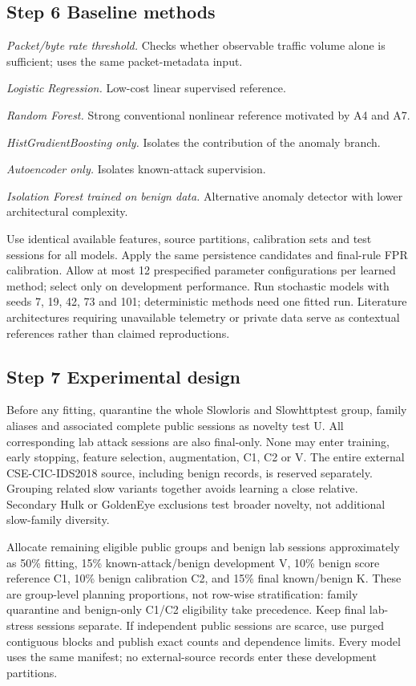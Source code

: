 \documentclass[conference]{IEEEtran}
\begin{document}
\subsection{Step 6 Baseline methods}
\noindent\textit{Packet/byte rate threshold.} Checks whether observable traffic volume alone is sufficient; uses the same packet-metadata input.

\noindent\textit{Logistic Regression.} Low-cost linear supervised reference.

\noindent\textit{Random Forest.} Strong conventional nonlinear reference motivated by A4 and A7.

\noindent\textit{HistGradientBoosting only.} Isolates the contribution of the anomaly branch.

\noindent\textit{Autoencoder only.} Isolates known-attack supervision.

\noindent\textit{Isolation Forest trained on benign data.} Alternative anomaly detector with lower architectural complexity.

Use identical available features, source partitions, calibration sets and test sessions for all models. Apply the same persistence candidates and final-rule FPR calibration. Allow at most 12 prespecified parameter configurations per learned method; select only on development performance. Run stochastic models with seeds 7, 19, 42, 73 and 101; deterministic methods need one fitted run. Literature architectures requiring unavailable telemetry or private data serve as contextual references rather than claimed reproductions.

\subsection{Step 7 Experimental design}
Before any fitting, quarantine the whole Slowloris and Slowhttptest group, family aliases and associated complete public sessions as novelty test U. All corresponding lab attack sessions are also final-only. None may enter training, early stopping, feature selection, augmentation, C1, C2 or V. The entire external CSE-CIC-IDS2018 source, including benign records, is reserved separately. Grouping related slow variants together avoids learning a close relative. Secondary Hulk or GoldenEye exclusions test broader novelty, not additional slow-family diversity.

Allocate remaining eligible public groups and benign lab sessions approximately as 50\% fitting, 15\% known-attack/benign development V, 10\% benign score reference C1, 10\% benign calibration C2, and 15\% final known/benign K. These are group-level planning proportions, not row-wise stratification: family quarantine and benign-only C1/C2 eligibility take precedence. Keep final lab-stress sessions separate. If independent public sessions are scarce, use purged contiguous blocks and publish exact counts and dependence limits. Every model uses the same manifest; no external-source records enter these development partitions.
\end{document}
